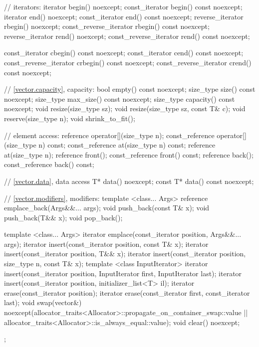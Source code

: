 \begin{codeblock}
{{    // iterators:
    iterator               begin() noexcept;
    const_iterator         begin() const noexcept;
    iterator               end() noexcept;
    const_iterator         end() const noexcept;
    reverse_iterator       rbegin() noexcept;
    const_reverse_iterator rbegin() const noexcept;
    reverse_iterator       rend() noexcept;
    const_reverse_iterator rend() const noexcept;

    const_iterator         cbegin() const noexcept;
    const_iterator         cend() const noexcept;
    const_reverse_iterator crbegin() const noexcept;
    const_reverse_iterator crend() const noexcept;

    // \ref{vector.capacity}, capacity:
    bool      empty() const noexcept;
    size_type size() const noexcept;
    size_type max_size() const noexcept;
    size_type capacity() const noexcept;
    void      resize(size_type sz);
    void      resize(size_type sz, const T& c);
    void      reserve(size_type n);
    void      shrink_to_fit();

    // element access:
    reference       operator[](size_type n);
    const_reference operator[](size_type n) const;
    const_reference at(size_type n) const;
    reference       at(size_type n);
    reference       front();
    const_reference front() const;
    reference       back();
    const_reference back() const;

    // \ref{vector.data}, data access
    T*       data() noexcept;
    const T* data() const noexcept;

    // \ref{vector.modifiers}, modifiers:
    template <class... Args> reference emplace_back(Args&&... args);
    void push_back(const T& x);
    void push_back(T&& x);
    void pop_back();

    template <class... Args> iterator emplace(const_iterator position, Args&&... args);
    iterator insert(const_iterator position, const T& x);
    iterator insert(const_iterator position, T&& x);
    iterator insert(const_iterator position, size_type n, const T& x);
    template <class InputIterator>
      iterator insert(const_iterator position, InputIterator first, InputIterator last);
    iterator insert(const_iterator position, initializer_list<T> il);
    iterator erase(const_iterator position);
    iterator erase(const_iterator first, const_iterator last);
    void     swap(vector&)
      noexcept(allocator_traits<Allocator>::propagate_on_container_swap::value ||
               allocator_traits<Allocator>::is_always_equal::value);
    void     clear() noexcept;
  };

}
\end{codeblock}
